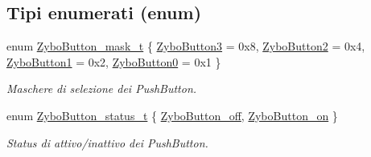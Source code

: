 \subsection*{Tipi enumerati (enum)}
\begin{DoxyCompactItemize}
\item 
enum \hyperlink{group___button_ga4d26a5f6cad606de534ba034e0ba42dd}{Zybo\+Button\+\_\+mask\+\_\+t} \{ \hyperlink{group___button_gga4d26a5f6cad606de534ba034e0ba42ddaabede392be8cae14b8a070a804c754e8}{Zybo\+Button3} = 0x8, 
\hyperlink{group___button_gga4d26a5f6cad606de534ba034e0ba42dda2aa888c8f01ac8a79013e5ebc9eef609}{Zybo\+Button2} = 0x4, 
\hyperlink{group___button_gga4d26a5f6cad606de534ba034e0ba42dda29c35ef3133898c050f675a60de66dd7}{Zybo\+Button1} = 0x2, 
\hyperlink{group___button_gga4d26a5f6cad606de534ba034e0ba42dda2f821ce9661687aefb0ec4de65911570}{Zybo\+Button0} = 0x1
 \}
\begin{DoxyCompactList}\small\item\em Maschere di selezione dei Push\+Button. \end{DoxyCompactList}\item 
enum \hyperlink{group___button_ga85c290bfa232cab213e69200bf78e06a}{Zybo\+Button\+\_\+status\+\_\+t} \{ \hyperlink{group___button_gga85c290bfa232cab213e69200bf78e06aacd110f28912806bcec929721e8737399}{Zybo\+Button\+\_\+off}, 
\hyperlink{group___button_gga85c290bfa232cab213e69200bf78e06aa49bf4a6902270f28bc6a1146fbd1b1fe}{Zybo\+Button\+\_\+on}
 \}
\begin{DoxyCompactList}\small\item\em Status di attivo/inattivo dei Push\+Button. \end{DoxyCompactList}\end{DoxyCompactItemize}
